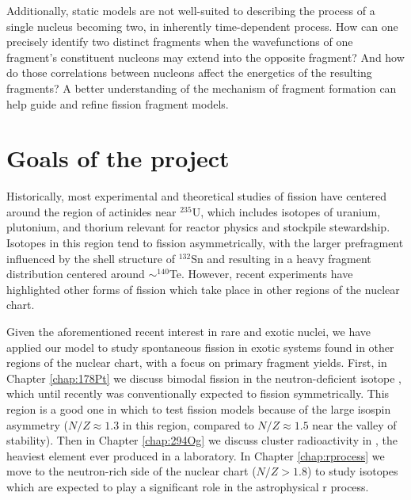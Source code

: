 Additionally, static models are not well-suited to describing the process of a single nucleus becoming two, in inherently time-dependent process. How can one precisely identify two distinct fragments when the wavefunctions of one fragment’s constituent nucleons may extend into the opposite fragment? And how do those correlations between nucleons affect the energetics of the resulting fragments? A better understanding of the mechanism of fragment formation can help guide and refine fission fragment models.


\section{Goals of the project}
Historically, most experimental and theoretical studies of fission have centered around the region of actinides near $^{235}$U, which includes isotopes of uranium, plutonium, and thorium relevant for reactor physics and stockpile stewardship. Isotopes in this region tend to fission asymmetrically, with the larger prefragment influenced by the shell structure of $^{132}$Sn and resulting in a heavy fragment distribution centered around $\sim^{140}$Te. However, recent experiments have highlighted other forms of fission which take place in other regions of the nuclear chart.%

Given the aforementioned recent interest in rare and exotic nuclei, we have applied our model to study spontaneous fission in exotic systems found in other regions of the nuclear chart, with a focus on primary fragment yields. First, in Chapter \ref{chap:178Pt} we discuss bimodal fission in the neutron-deficient isotope {\Pt}, which until recently was conventionally expected to fission symmetrically. This region is a good one in which to test fission models because of the large isospin asymmetry ($N/Z\approx1.3$ in this region, compared to $N/Z\approx1.5$ near the valley of stability). Then in Chapter \ref{chap:294Og} we discuss cluster radioactivity in {\Og}, the heaviest element ever produced in a laboratory. In Chapter \ref{chap:rprocess} we move to the neutron-rich side of the nuclear chart ($N/Z>1.8$) to study isotopes which are expected to play a significant role in the astrophysical r process. %


